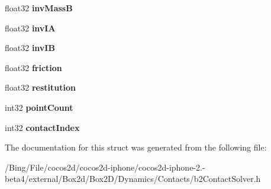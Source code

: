 \begin{DoxyCompactItemize}
\item 
\hypertarget{structb2_contact_velocity_constraint_ac75c816e94402ed4d93f232d211d4f62}{float32 {\bfseries inv\-Mass\-B}}\label{structb2_contact_velocity_constraint_ac75c816e94402ed4d93f232d211d4f62}

\item 
\hypertarget{structb2_contact_velocity_constraint_ac6c18706a9ee89c5a682dc610e86e00f}{float32 {\bfseries inv\-I\-A}}\label{structb2_contact_velocity_constraint_ac6c18706a9ee89c5a682dc610e86e00f}

\item 
\hypertarget{structb2_contact_velocity_constraint_aae02d4fd8f60353385b9cc876dc78a81}{float32 {\bfseries inv\-I\-B}}\label{structb2_contact_velocity_constraint_aae02d4fd8f60353385b9cc876dc78a81}

\item 
\hypertarget{structb2_contact_velocity_constraint_a11025786ae828eeeb60dfcd15358d934}{float32 {\bfseries friction}}\label{structb2_contact_velocity_constraint_a11025786ae828eeeb60dfcd15358d934}

\item 
\hypertarget{structb2_contact_velocity_constraint_a6734f74c1970abc64ed7dcffd8737257}{float32 {\bfseries restitution}}\label{structb2_contact_velocity_constraint_a6734f74c1970abc64ed7dcffd8737257}

\item 
\hypertarget{structb2_contact_velocity_constraint_a1decd7bf6a5dc61bd72d4e87b070a660}{int32 {\bfseries point\-Count}}\label{structb2_contact_velocity_constraint_a1decd7bf6a5dc61bd72d4e87b070a660}

\item 
\hypertarget{structb2_contact_velocity_constraint_a4c76b9292f28859e2f8c9d075e79b873}{int32 {\bfseries contact\-Index}}\label{structb2_contact_velocity_constraint_a4c76b9292f28859e2f8c9d075e79b873}

\end{DoxyCompactItemize}


The documentation for this struct was generated from the following file\-:\begin{DoxyCompactItemize}
\item 
/\-Bing/\-File/cocos2d/cocos2d-\/iphone/cocos2d-\/iphone-\/2.-\/beta4/external/\-Box2d/\-Box2\-D/\-Dynamics/\-Contacts/b2\-Contact\-Solver.\-h\end{DoxyCompactItemize}
